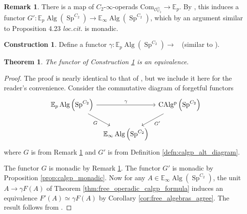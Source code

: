 \documentclass{article}
\DeclareMathOperator{\Alg}{Alg}
\DeclareMathOperator{\CAlgp}{CAlg^p} %
\DeclareMathOperator{\Spectra}{Sp} %
\newcommand{\EE}{\mathbb{E}}
\newtheorem{theorem}[equation]{Theorem}
\theoremstyle{definition}
\newtheorem{construction}[equation]{Construction}
\newtheorem{remark}[equation]{Remark}
\newcommand{\Lucyil}[1]{\todo[inline,color=cyan!30]{\footnotesize L: #1}}
\begin{document}
\begin{remark}\label{rmk:operadic_Poincare_rings_to_E_infty_alg_in_genuine_spectra}
    There is a map of $ C_2 $-$ \infty $-operads $ \mathrm{Com}_{\mathcal{O}_{C_2}^\simeq} \to \EE_p $. 
    By \cite[Lemma 4.24]{LYang_normedrings}, this induces a functor $ G'\colon \EE_p\Alg\left(\Spectra^{C_2}\right) \to \EE_\infty\Alg\left(\Spectra^{C_2}\right) $, which by an argument similar to Proposition 4.23 \emph{loc.cit.} is monadic. 
\end{remark}
\begin{construction}\label{cons:calgp_operadic_to_diagrammatic}
    Define a functor $ \gamma \colon \EE_p \Alg(\Spectra^{C_2}) \to \CAlgp $ (similar to \cite[\S4.1]{LYang_normedrings}). 
\end{construction}
\begin{theorem}\label{thm:operadic_diagrammatic_calgp_agree}
    The functor of Construction \ref{cons:calgp_operadic_to_diagrammatic} is an equivalence. 
\end{theorem}
\begin{proof}
    The proof is nearly identical to that of \cite[Theorem 4.21]{LYang_normedrings}, but we include it here for the reader's convenience. 
    Consider the commutative diagram of forgetful functors 
    \begin{equation}\label{diagram:forgetforget_is_forget}
    \begin{tikzcd}[column sep=tiny]
        \EE_p\Alg\left(\Spectra^{C_2}\right) \ar[rr,"\gamma"] \ar[rd,"G"'] & & \CAlgp\left(\Spectra^{C_2}\right) \ar[ld,"G'"] \\
        & \EE_\infty\Alg\left(\Spectra^{C_2}\right) & 
    \end{tikzcd}
    \end{equation} 
    where $ G $ is from Remark \ref{rmk:operadic_Poincare_rings_to_E_infty_alg_in_genuine_spectra} and $ G' $ is from Definition \ref{defn:calgp_alt_diagram}. 

    The functor $ G $ is monadic by Remark \ref{rmk:operadic_Poincare_rings_to_E_infty_alg_in_genuine_spectra}. 
    The functor $ G' $ is monadic by Proposition \ref{prop:calgp_monadic}.
    Now for any $ A \in \EE_\infty\Alg\left(\Spectra^{C_2}\right) $, the unit $ A \to \gamma F(A) $ of Theorem \ref{thm:free_operadic_calgp_formula} induces an equivalence $ F'(A) \simeq \gamma F(A) $ by Corollary \ref{cor:free_algebras_agree}.  
    The result follows from \cite[Proposition 4.7.3.16]{LurHA}. 
\end{proof}
\end{document}
